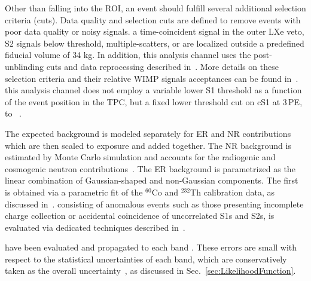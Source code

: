 Other than falling into the ROI, an event should fulfill several additional selection criteria (cuts). Data quality and selection cuts are defined to remove events with poor data quality or noisy signals.  a time-coincident signal in the outer LXe veto, S2 signals below threshold, multiple-scatters, or are localized outside a predefined fiducial volume of 34 kg. In addition, this analysis channel uses the post-unblinding cuts and data reprocessing described in~\cite{xe100_run_combination}. More details on these selection criteria and their relative WIMP signals acceptances can be found in~\cite{Aprile:2012vw,xe100_run_combination}. 
this analysis channel does not employ a variable lower S1 threshold as a function of the event position in the TPC, but  a fixed lower threshold cut on cS1 at 3\,PE,  to ~\cite{xe100_run_combination}.

The expected background is modeled separately for ER and NR contributions which are then scaled to exposure and added together.
The NR background is estimated by Monte Carlo simulation and accounts for the radiogenic and cosmogenic neutron
contributions~\cite{Aprile:2013tov}.
The ER background is parametrized as the linear combination of Gaussian-shaped and non-Gaussian components.
The first is obtained via a parametric fit of the $^{60}$Co and $^{232}$Th calibration data, as discussed in~\cite{xe100_run10_si}.
 consisting of anomalous events such as those 
presenting incomplete charge collection or accidental coincidence of uncorrelated S1s and S2s,  
is evaluated via dedicated techniques described in~\cite{xe100_run_combination}.

have been evaluated and propagated to each band 
. These errors are small with respect to the statistical uncertainties of each band, which are conservatively taken as the overall uncertainty~\cite{xe100_run_combination}, as discussed in Sec.~\ref{sec:LikelihoodFunction}.

